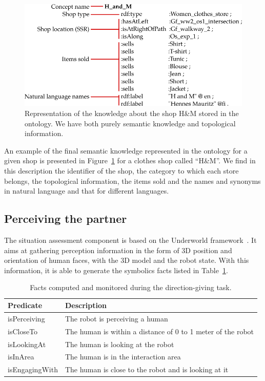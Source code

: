 \begin{figure}[ht!]
\centering
\includegraphics[scale=0.5]{figures/chapter8/zizzi.png}
\caption{\label{fig:chap8_zizzi} Representation of the knowledge about the shop H\&M stored in the ontology. We have both purely semantic knowledge and topological information. }
\end{figure}

An example of the final semantic knowledge represented in the ontology for a given shop is presented in Figure~\ref{fig:chap8_zizzi} for a clothes shop called ``H\&M''. We find in this description the identifier of the shop, the category to which each store belongs, the topological information, the items sold and the names and synonyms in natural language and that for different languages.

\subsection{Perceiving the partner}

The situation assessment component is based on the Underworld framework~\cite{lemaignan_2018_underworlds}. It aims at gathering perception information in the form of 3D position and orientation of human faces, with the 3D model and the robot state. With this information, it is able to generate the symbolics facts listed in Table~\ref{tab:chap8_predicates}.

\begin{table}[ht!]
    \centering
    \begin{tabularx}{\textwidth}{|l|X|}
     \hline
    \textbf{Predicate} & \textbf{Description} \\
    \hline
    \hline
        isPerceiving & The robot is perceiving a human \\
        \hline
        isCloseTo & The human is within a distance of 0 to 1 meter of the robot \\
         \hline
        isLookingAt & The human is looking at the robot \\
        \hline
    \hline
        isInArea & The human is in the interaction area \\
        \hline
        isEngagingWith & The human is close to the robot and is looking at it \\
       \hline
    \end{tabularx}
    \caption{Facts computed and monitored during the direction-giving task.}
    \label{tab:chap8_predicates}
\end{table}

